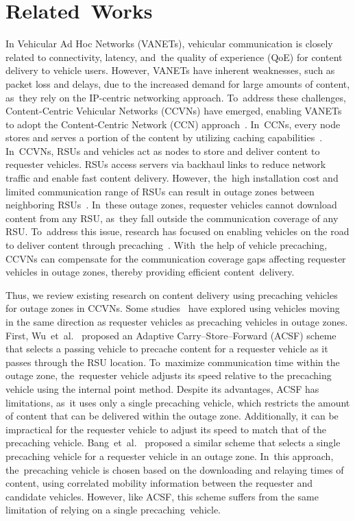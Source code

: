 \documentclass[electronics,aricle,accept,pdftex,moreauthors]{Definitions/mdpi}
\begin{document}
\section{Related~Works} \label{sec1}
In Vehicular Ad Hoc Networks (VANETs), vehicular communication is closely related to connectivity, latency, and~the quality of experience (QoE) for content delivery to vehicle users. However, VANETs have inherent weaknesses, such as packet loss and delays, due to the increased demand for large amounts of content, as~they rely on the IP-centric networking approach. To~address these challenges, Content-Centric Vehicular Networks (CCVNs) have emerged, enabling VANETs to adopt the Content-Centric Network (CCN) approach~\cite{Jacobson2009, zhang2014}. In~CCNs, every node stores and serves a portion of the content by utilizing caching capabilities~\cite{Amadeo2012, Amadeo2012Crown, Salahuddin2014, Bouk2015C, Su2017, Wang2017, Rahman2018, Wang2019, Elsayed2022, AlNagar2022}. In~CCVNs, RSUs and vehicles act as nodes to store and deliver content to requester vehicles. RSUs access servers via backhaul links to reduce network traffic and enable fast content delivery. However, the~high installation cost and limited communication range of RSUs can result in outage zones between neighboring RSUs~\cite{Kim2017}. In~these outage zones, requester vehicles cannot download content from any RSU, as~they fall outside the communication coverage of any RSU. To~address this issue, research has focused on enabling vehicles on the road to deliver content through precaching~\cite{Bouk2015C, Khelifi2020}. With~the help of vehicle precaching, CCVNs can compensate for the communication coverage gaps affecting requester vehicles in outage zones, thereby providing efficient content~delivery.

Thus, we review existing research on content delivery using precaching vehicles for outage zones in CCVNs. Some studies~\cite{Wu2013, Bang2020, Ahmed2018, Nam2023} have explored using vehicles moving in the same direction as requester vehicles as precaching vehicles in outage zones. First, Wu~et~al.~\cite{Wu2013} proposed an Adaptive Carry--Store--Forward (ACSF) scheme that selects a passing vehicle to precache content for a requester vehicle as it passes through the RSU location. To~maximize communication time within the outage zone, the~requester vehicle adjusts its speed relative to the precaching vehicle using the internal point method. Despite its advantages, ACSF has limitations, as~it uses only a single precaching vehicle, which restricts the amount of content that can be delivered within the outage zone. Additionally, it can be impractical for the requester vehicle to adjust its speed to match that of the precaching vehicle. Bang~et~al.~\cite{Bang2020} proposed a similar scheme that selects a single precaching vehicle for a requester vehicle in an outage zone. In~this approach, the~precaching vehicle is chosen based on the downloading and relaying times of content, using correlated mobility information between the requester and candidate vehicles. However, like ACSF, this scheme suffers from the same limitation of relying on a single precaching~vehicle.
\end{document}
